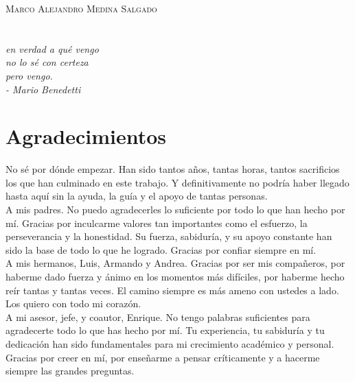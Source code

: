 \documentclass[10pt, oneside]{book}
\begin{document}
\textsc{Marco Alejandro Medina Salgado}

\endgroup
\vspace*{\fill}


\pagestyle{plain}
\frontmatter

\chapter*{}
\begin{flushright}
\textit{en verdad a qué vengo \\ no lo sé con certeza \\ pero vengo. \\ - Mario Benedetti}
\end{flushright}


\chapter*{Agradecimientos}

No sé por dónde empezar. Han sido tantos años, tantas horas, tantos sacrificios los que han culminado en este trabajo. Y definitivamente no podría haber llegado hasta aquí sin la ayuda, la guía y el apoyo de tantas personas. \\

\noindent A mis padres. No puedo agradecerles lo suficiente por todo lo que han hecho por mí. Gracias por inculcarme valores tan importantes como el esfuerzo, la perseverancia y la honestidad. Su fuerza, sabiduría, y su apoyo constante han sido la base de todo lo que he logrado. Gracias por confiar siempre en mí. \\

\noindent A mis hermanos, Luis, Armando y Andrea. Gracias por ser mis compañeros, por haberme dado fuerza y ánimo en los momentos más difíciles, por haberme hecho reír tantas y tantas veces. El camino siempre es más ameno con ustedes a lado. Los quiero con todo mi corazón. \\

\noindent A mi asesor, jefe, y coautor, Enrique. No tengo palabras suficientes para agradecerte todo lo que has hecho por mí. Tu experiencia, tu sabiduría y tu dedicación han sido fundamentales para mi crecimiento académico y personal. Gracias por creer en mí, por enseñarme a pensar críticamente y a hacerme siempre las grandes preguntas. \\
\end{document}
